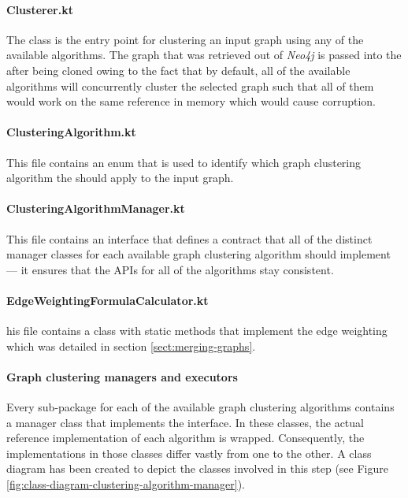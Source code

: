 \documentclass[12pt,a4paper]{report}
\begin{document}
\paragraph{Clusterer.kt}
The  class is the entry point for
clustering an input graph using any of the available algorithms. The graph that
was retrieved out of \textit{Neo4j} is passed into the  after
being cloned owing to the fact that by default, all of the available algorithms
will concurrently cluster the selected graph such that all of them would work
on the same reference in memory which would cause corruption.

\paragraph{ClusteringAlgorithm.kt}
This file contains an enum that is used to
identify which graph clustering algorithm the  should apply to
the input graph.

\paragraph{ClusteringAlgorithmManager.kt}
This file contains an interface that
defines a contract that all of the distinct manager classes for each available
graph clustering algorithm should implement --- it ensures that the APIs for
all of the algorithms stay consistent.

\paragraph{EdgeWeightingFormulaCalculator.kt}
his file contains a class with
static methods that implement the edge weighting which was detailed in section
\ref{sect:merging-graphs}.

\paragraph{Graph clustering managers and executors}
Every sub-package for each
of the available graph clustering algorithms contains a manager class that
implements the  interface. In these classes,
the actual reference implementation of each algorithm is wrapped. Consequently,
the implementations in those classes differ vastly from one to the other. A
class diagram has been created to depict the classes involved in this step (see
Figure \ref{fig:class-diagram-clustering-algorithm-manager}).
\end{document}
